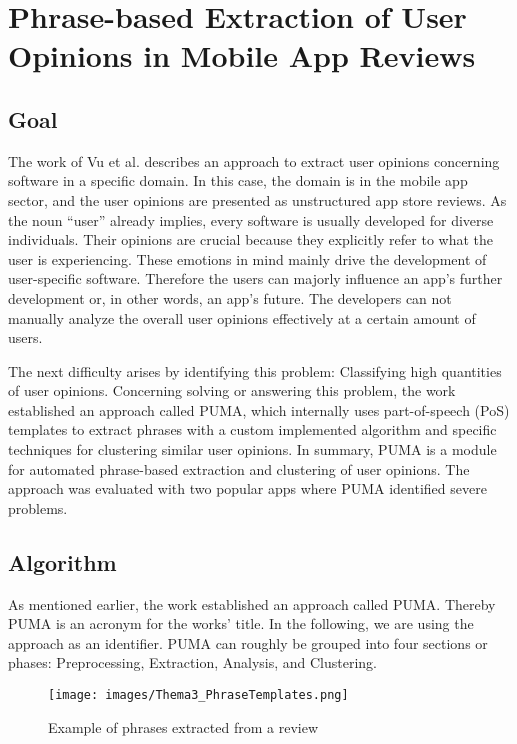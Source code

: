 \chapter{Phrase-based Extraction of User Opinions in Mobile App Reviews}
\label{chap:3}

\section{Goal}

The work of Vu et al. \cite{Vu} describes an approach to extract user opinions concerning software in a specific domain. In this case, the domain is in the mobile app sector, and the user opinions are presented as unstructured app store reviews. As the noun “user” already implies, every software is usually developed for diverse individuals. Their opinions are crucial because they explicitly refer to what the user is experiencing. These emotions in mind mainly drive the development of user-specific software. Therefore the users can majorly influence an app’s further development or, in other words, an app’s future. The developers can not manually analyze the overall user opinions effectively at a certain amount of users.

The next difficulty arises by identifying this problem: Classifying high quantities of user opinions. Concerning solving or answering this problem, the work established an approach called PUMA, which internally uses part-of-speech (PoS) templates to extract phrases with a custom implemented algorithm and specific techniques for clustering similar user opinions. In summary, PUMA is a module for automated phrase-based extraction and clustering of user opinions. The approach was evaluated with two popular apps where PUMA identified severe problems.

\section{Algorithm}
As mentioned earlier, the work established an approach called PUMA. Thereby PUMA is an acronym for the works’ title. In the following, we are using the approach as an identifier. PUMA can roughly be grouped into four sections or phases: Preprocessing, Extraction, Analysis, and Clustering.

\begin{figure}
\centering
\texttt{[image: images/Thema3\_PhraseTemplates.png]}
\caption{Example of phrases extracted from a review \cite{Vu}}
\label{fig:phraseTemplates}
\end{figure}

